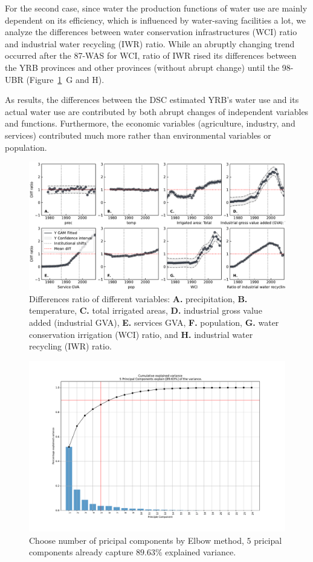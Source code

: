 For the second case, since water the production functions of water use are mainly dependent on its efficiency, which is influenced by water-saving facilities a lot, we analyze the differences between water conservation infrastructures (WCI) ratio and industrial water recycling (IWR) ratio. While an abruptly changing trend occurred after the 87-WAS for WCI, ratio of IWR rised its differences between the YRB provinces and other provinces (without abrupt change) until the 98-UBR (Figure~\ref{fig:variables}~G and H).

As results, the differences between the DSC estimated YRB's water use and its actual water use are contributed by both abrupt changes of independent variables and functions. Furthermore, the economic variables (agriculture, industry, and services) contributed much more rather than environmental variables or population.

\begin{figure}
    \includegraphics[width=0.9\linewidth]{outputs/variables.pdf}
    \centering
    \caption{Differences ratio of different variables: \textbf{A.} precipitation, \textbf{B.} temperature, \textbf{C.} total irrigated areas, \textbf{D.} industrial gross value added (industrial GVA), \textbf{E.} services GVA, \textbf{F.} population, \textbf{G.} water conservation irrigation (WCI) ratio, and \textbf{H.} industrial water recycling (IWR) ratio.}
    \label{fig:variables}
\end{figure}

\begin{figure}
    \includegraphics[width=0.9\linewidth]{outputs/elbow.pdf}
    \centering
    \caption{Choose number of pricipal components by Elbow method, $5$ pricipal components already capture $89.63\%$ explained variance.}
    \label{fig:elbow}
\end{figure}


